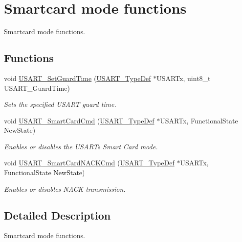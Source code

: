 \hypertarget{group___u_s_a_r_t___group6}{}\section{Smartcard mode functions}
\label{group___u_s_a_r_t___group6}


Smartcard mode functions.  


\subsection*{Functions}
\begin{DoxyCompactItemize}
\item 
void \hyperlink{group___u_s_a_r_t___group6_gac4a35c6acd71ae7e0d67c1f03f0a8777}{U\+S\+A\+R\+T\+\_\+\+Set\+Guard\+Time} (\hyperlink{struct_u_s_a_r_t___type_def}{U\+S\+A\+R\+T\+\_\+\+Type\+Def} $\ast$U\+S\+A\+R\+Tx, uint8\+\_\+t U\+S\+A\+R\+T\+\_\+\+Guard\+Time)
\begin{DoxyCompactList}\small\item\em Sets the specified U\+S\+A\+RT guard time. \end{DoxyCompactList}\item 
void \hyperlink{group___u_s_a_r_t___group6_gabd1347e244c623447151ba3a5e986c5f}{U\+S\+A\+R\+T\+\_\+\+Smart\+Card\+Cmd} (\hyperlink{struct_u_s_a_r_t___type_def}{U\+S\+A\+R\+T\+\_\+\+Type\+Def} $\ast$U\+S\+A\+R\+Tx, Functional\+State New\+State)
\begin{DoxyCompactList}\small\item\em Enables or disables the U\+S\+A\+RT\textquotesingle{}s Smart Card mode. \end{DoxyCompactList}\item 
void \hyperlink{group___u_s_a_r_t___group6_ga62e22f47e38aa53f2edce8771f7a5dfa}{U\+S\+A\+R\+T\+\_\+\+Smart\+Card\+N\+A\+C\+K\+Cmd} (\hyperlink{struct_u_s_a_r_t___type_def}{U\+S\+A\+R\+T\+\_\+\+Type\+Def} $\ast$U\+S\+A\+R\+Tx, Functional\+State New\+State)
\begin{DoxyCompactList}\small\item\em Enables or disables N\+A\+CK transmission. \end{DoxyCompactList}\end{DoxyCompactItemize}


\subsection{Detailed Description}
Smartcard mode functions. 

